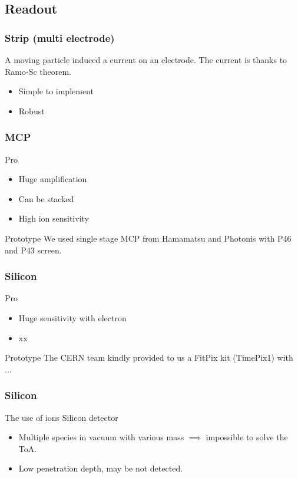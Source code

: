 \subsection{Readout}
\begin{frame}
  \frametitle{Strip (multi electrode)}
  A moving particle induced a current on an electrode. The current is  thanks to Ramo-Sc theorem.
  \begin{itemize}
    \item Simple to implement
    \item Robust
  \end{itemize}
\end{frame}

\begin{frame}
  \frametitle{MCP}

  \begin{block}{Pro}
    \begin{itemize}
      \item Huge amplification
      \item Can be stacked
      \item High ion sensitivity
    \end{itemize}
  \end{block}

  \begin{block}{Prototype}
    We used single stage MCP from Hamamatsu and Photonis with P46 and P43 screen.
  \end{block}
\end{frame}

\begin{frame}
  \frametitle{Silicon}

  \begin{block}{Pro}
    \begin{itemize}
      \item Huge sensitivity with electron
      \item xx
    \end{itemize}
  \end{block}
  \begin{block}{Prototype}
    The CERN team kindly provided to us a FitPix kit (TimePix1) with ...
  \end{block}
\end{frame}

\begin{frame}
  \frametitle{Silicon}
  \begin{alertblock}{The use of ions}
    Silicon detector
    \begin{itemize}
      \item Multiple species in vacuum with various mass $\implies$ impossible to solve the ToA.
      \item Low penetration depth, may be not detected.
    \end{itemize}
  \end{alertblock}
\end{frame}